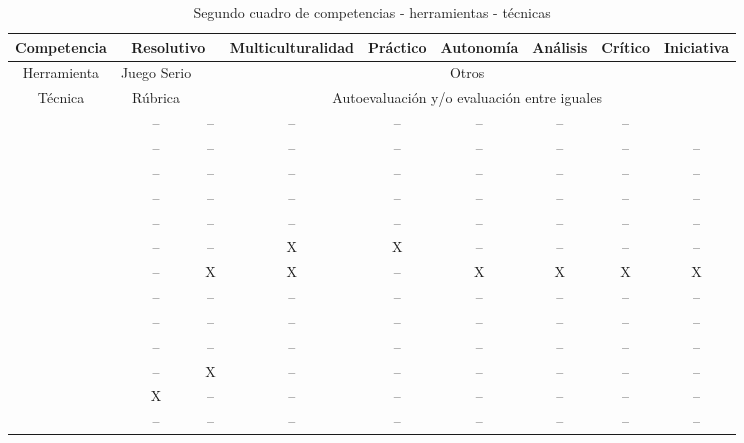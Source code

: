 \begin{landscape}
\begin{table}[H]
  \begin{center}
  \begin{tabular}{| c | c | c | c | c | c | c | c | c |}
    \hline
    \scriptsize{Competencia} & \multicolumn{2}{c|}{Resolutivo} & Multiculturalidad & Práctico & Autonomía & Análisis & Crítico & Iniciativa \\
    \hline
    \scriptsize{Herramienta} & Juego Serio & \multicolumn{7}{c|}{Otros} \\
    \hline
    \scriptsize{Técnica} & Rúbrica & \multicolumn{7}{c|}{Autoevaluación y/o evaluación entre iguales} \\
    \hline
    \hline 
    \cite{Shih:2011} & -- & -- & -- & -- & -- & -- & -- & \\
    \hline
    \cite{MercedesRico:2013} & -- & -- & -- & -- & -- & -- & -- &  -- \\
    \hline
    \cite{Masip-Alvarez:2013} & -- & -- & -- & -- & -- & -- & -- &  --\\
    \hline
    \cite{Mohamed:2008} & -- & -- & -- & -- & -- & -- & -- &  --\\
    \hline
    \cite{Piedra:2010} & -- & -- & -- & -- & -- & -- & -- & -- \\
    \hline
    \cite{Liao:2013} & -- & -- & X & X & -- & -- & -- & -- \\
    \hline
    \cite{Colomo-Palacios:2013} & -- & X & X & -- & X & X & X & X \\ %
    \hline
    \cite{McMahon:2007} & -- & -- & -- & -- & -- & -- & -- & -- \\
    \hline
    \cite{Rashid:2008} & -- & -- & -- & -- & -- & -- & -- &  --\\
    \hline
    \cite{Lim:2011} & -- & -- & -- & -- & -- & -- & -- & -- \\
    \hline
    \cite{Achcaoucaou:2012} & --  & X & -- & -- & -- & -- & -- &  --\\
    \hline
    \cite{Guenaga:2013} & X & -- & -- & -- & -- & -- &  -- & --\\
    \hline
    \cite{Martin-Cuadrado:2013} & -- & -- & -- & -- & -- & -- &  -- & -- \\
    \hline
  \end{tabular}
\end{center}
\caption{Segundo cuadro de competencias - herramientas - técnicas}
\label{tab:CuadroPreguntas2}
\end{table} 
\end{landscape}

